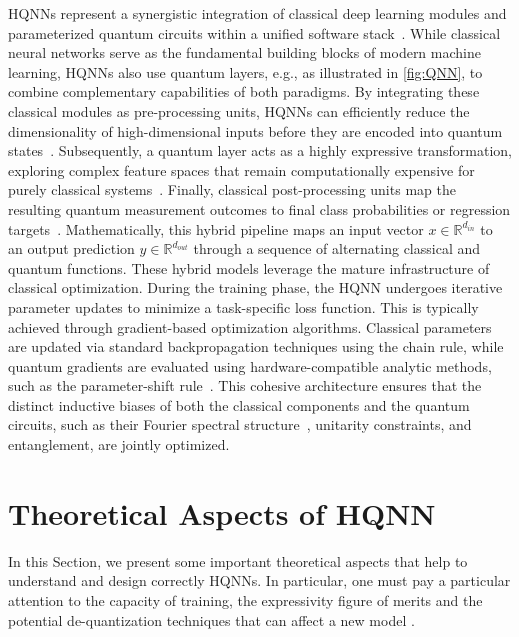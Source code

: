 \documentclass[aps,10pt,groupedaddress,prx,superscriptaddress,twocolumn,balancelastpage, tightenlines]{revtex4-2}
\theoremstyle{plain}  %
\begin{document}
\glspl{HQNN} represent a synergistic integration of classical deep learning modules and parameterized quantum circuits within a unified software stack~\cite{Mitarai_2018_QClearning, mari2020transfer, Chen2020HybridNN, meyer2024qiskit}. While classical neural networks serve as the fundamental building blocks of modern machine learning, HQNNs also use quantum layers, e.g., as illustrated in \autoref{fig:QNN}, to combine complementary capabilities of both paradigms. By integrating these classical modules as pre-processing units, HQNNs can efficiently reduce the dimensionality of high-dimensional inputs before they are encoded into quantum states~\cite{mari2020transfer}. Subsequently, a quantum layer acts as a highly expressive transformation, exploring complex feature spaces that remain computationally expensive for purely classical systems~\cite{Schuld_2021_Effect, Benedetti_2019_Parameterized}. Finally, classical post-processing units map the resulting quantum measurement outcomes to final class probabilities or regression targets~\cite{Chen2020HybridNN, Sharma_2020_Noiseresilience}. Mathematically, this hybrid pipeline maps an input vector $x \in \mathbb{R}^{d_{in}}$ to an output prediction $y \in \mathbb{R}^{d_{out}}$ through a sequence of alternating classical and quantum functions. These hybrid models leverage the mature infrastructure of classical optimization. During the training phase, the HQNN undergoes iterative parameter updates to minimize a task-specific loss function. This is typically achieved through gradient-based optimization algorithms. Classical parameters are updated via standard backpropagation techniques using the chain rule, while quantum gradients are evaluated using hardware-compatible analytic methods, such as the parameter-shift rule~\cite{Schuld_2019_ParamShift, Mitarai_2018_QClearning, periyasamy2024guided}. This cohesive architecture ensures that the distinct inductive biases of both the classical components and the quantum circuits, such as their Fourier spectral structure~\cite{Schuld_2021_Effect, wiedmann2025fourier}, unitarity constraints, and entanglement, are jointly optimized.



    \section{Theoretical Aspects of HQNN}
    \label{sec:theory}

In this Section, we present some important theoretical aspects that help to understand and design correctly \glspl{HQNN}. In particular, one must pay a particular attention to the capacity of training, the expressivity figure of merits and the potential de-quantization techniques that can affect a new model \cite{monbroussou_quantum_2025}.
\end{document}
